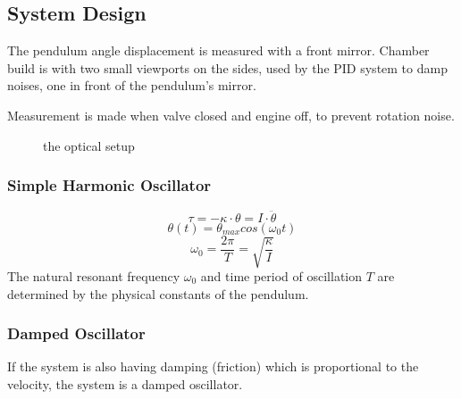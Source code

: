 \documentclass[\main/master.tex]{subfiles}
\begin{document}
\subsection{System Design}
The pendulum angle displacement is measured with a front mirror. Chamber build is  with two small viewports on the sides, used by the PID system to damp noises, one in front of the pendulum's mirror. 
\par
Measurement is made when valve closed and engine off, to prevent rotation noise.
\begin{figure}[htbp]
	\centering
	\caption[optical setup]{the optical setup}
	\label{fig:optical setup}
\end{figure}

\newpage

\subsubsection{Simple Harmonic Oscillator}

\begin{equation}
\tau = -\kappa\cdot\theta  = I\cdot\ddot{\theta}   \label{eqn:undamped_motion_equation}
\end{equation}
\begin{equation}
\theta(t) = \theta_{max}cos(\omega_0 t )    \label{eqn:undamped_motion_equation}
\end{equation}
\begin{equation}
\omega_0  = \frac{2\pi}{T} = \sqrt{\frac{\kappa}{I}}   \label{eqn:undamped_motion_equation}
\end{equation}
The natural resonant frequency $\omega_0$ and time period of oscillation $T$ are determined by the physical constants of the pendulum.


\subsubsection{Damped Oscillator}
If the system is also having damping (friction) which is proportional to the velocity, the system is a damped oscillator.
\end{document}

